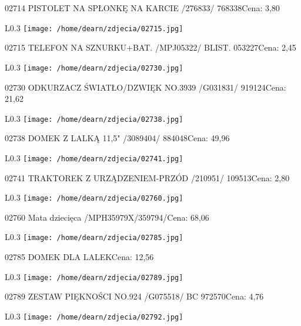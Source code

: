 02714 PISTOLET NA SPŁONKĘ NA KARCIE /276833/          768338Cena: 3,80\newline
\begin{wrapfigure}{L}{0.3\textwidth}
\texttt{[image: /home/dearn/zdjecia/02715.jpg]}
\end{wrapfigure}
02715 TELEFON NA SZNURKU+BAT. /MPJ05322/  BLIST.      053227Cena: 2,45\newline
\begin{wrapfigure}{L}{0.3\textwidth}
\texttt{[image: /home/dearn/zdjecia/02730.jpg]}
\end{wrapfigure}
02730 ODKURZACZ ŚWIATŁO/DZWIĘK NO.3939 /G031831/      919124Cena: 21,62\newline
\begin{wrapfigure}{L}{0.3\textwidth}
\texttt{[image: /home/dearn/zdjecia/02738.jpg]}
\end{wrapfigure}
02738 DOMEK Z LALKĄ 11,5" /3089404/                   884048Cena: 49,96\newline
\begin{wrapfigure}{L}{0.3\textwidth}
\texttt{[image: /home/dearn/zdjecia/02741.jpg]}
\end{wrapfigure}
02741 TRAKTOREK Z URZĄDZENIEM-PRZÓD /210951/          109513Cena: 2,80\newline
\begin{wrapfigure}{L}{0.3\textwidth}
\texttt{[image: /home/dearn/zdjecia/02760.jpg]}
\end{wrapfigure}
02760 Mata dziecięca /MPH35979X/359794/Cena: 68,06\newline
\begin{wrapfigure}{L}{0.3\textwidth}
\texttt{[image: /home/dearn/zdjecia/02785.jpg]}
\end{wrapfigure}
02785 DOMEK DLA LALEKCena: 12,56\newline
\begin{wrapfigure}{L}{0.3\textwidth}
\texttt{[image: /home/dearn/zdjecia/02789.jpg]}
\end{wrapfigure}
02789 ZESTAW PIĘKNOŚCI NO.924  /G075518/  BC          972570Cena: 4,76\newline
\begin{wrapfigure}{L}{0.3\textwidth}
\texttt{[image: /home/dearn/zdjecia/02792.jpg]}
\end{wrapfigure}
